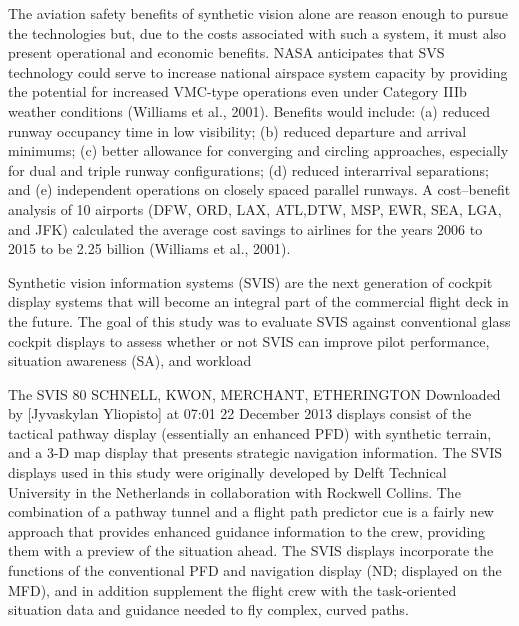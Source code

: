 \documentclass[utf8,bachelor,manualbib]{gradu3}
\begin{document}
The aviation safety benefits of synthetic vision alone are reason enough to pursue
the technologies but, due to the costs associated with such a system, it must also
present operational and economic benefits. NASA anticipates that SVS technology
could serve to increase national airspace system capacity by providing the potential
for increased VMC-type operations even under Category IIIb weather conditions
(Williams et al., 2001). Benefits would include: (a) reduced runway
occupancy time in low visibility; (b) reduced departure and arrival minimums; (c)
better allowance for converging and circling approaches, especially for dual and
triple runway configurations; (d) reduced interarrival separations; and (e) independent
operations on closely spaced parallel runways. A cost–benefit analysis of
10 airports (DFW, ORD, LAX, ATL,DTW, MSP, EWR, SEA, LGA, and JFK) calculated
the average cost savings to airlines for the years 2006 to 2015 to be 2.25
billion (Williams et al., 2001). \citep{prinzel2004}

Synthetic vision information systems (SVIS) are the next generation of cockpit display
systems that will become an integral part of the commercial flight deck in the future.
The goal of this study was to evaluate SVIS against conventional glass cockpit
displays to assess whether or not SVIS can improve pilot performance, situation
awareness (SA), and workload \citep{schnell2004}

The SVIS
80 SCHNELL, KWON, MERCHANT, ETHERINGTON
Downloaded by [Jyvaskylan Yliopisto] at 07:01 22 December 2013
displays consist of the tactical pathway display (essentially an enhanced PFD)
with synthetic terrain, and a 3-D map display that presents strategic navigation information.
The SVIS displays used in this study were originally developed by
Delft Technical University in the Netherlands in collaboration with Rockwell Collins.
The combination of a pathway tunnel and a flight path predictor cue is a fairly
new approach that provides enhanced guidance information to the crew, providing
them with a preview of the situation ahead. The SVIS displays incorporate the
functions of the conventional PFD and navigation display (ND; displayed on the
MFD), and in addition supplement the flight crew with the task-oriented situation
data and guidance needed to fly complex, curved paths. \citep{schnell2004}
\end{document}
